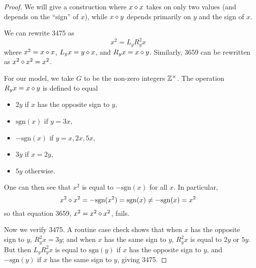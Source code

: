 \begin{proof} We will give a construction where $x \diamond x$ takes on only two values (and depends on the ``sign'' of $x$), while $x \diamond y$ depends primarily on $y$ and the sign of $x$.

We can rewrite 3475 as
$$ x^2 = L_y R_y^2 x$$
where $x^2 = x \diamond x$, $L_y x = y \diamond x$, and $R_y x = x \diamond y$. Similarly, 3659 can be rewritten as $x^2 \diamond x^2 = x^2$.

For our model, we take $G$ to be the non-zero integers $\mathbb{Z}^\times$.  The operation $R_y x = x \diamond y$ is defined to equal
\begin{itemize}
\item $2y$ if $x$ has the opposite sign to $y$,
\item $\mathrm{sgn}(x)$ if $y = 3x$,
\item $-\mathrm{sgn}(x)$ if $y = x, 2x, 5x$,
\item $3y$ if $x=2y$,
\item $5y$ otherwise.
\end{itemize}
One can then see that $x^2$ is equal to $-\mathrm{sgn}(x)$ for all $x$.  In particular,
$$ x^2 \diamond x^2 = -\mathrm{sgn}(x^2) = \mathrm{sgn}(x) \neq - \mathrm{sgn}(x) = x^2$$
so that equation 3659, $x^2 = x^2 \diamond x^2$, fails.

Now we verify 3475.  A routine case check shows that when $x$ has the opposite sign to $y$, $R_y^2 x = 3y$; and when $x$ has the same sign to $y$, $R_y^2 x$ is equal to $2y$ or $5y$.  But then $L_y R_y^2 x$ is equal to $\mathrm{sgn}(y)$ if $x$ has the opposite sign to $y$, and $-\mathrm{sgn}(y)$ if $x$ has the same sign to $y$, giving 3475.
\end{proof}
